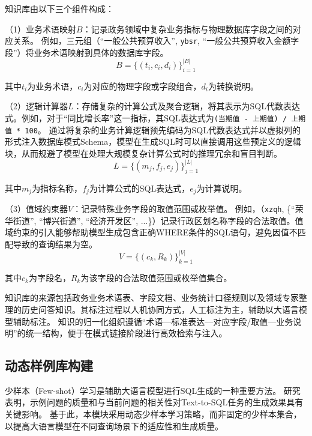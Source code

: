 知识库由以下三个组件构成：

（1）业务术语映射$B$：记录政务领域中复杂业务指标与物理数据库字段之间的对应关系。
例如，三元组（“一般公共预算收入”, \texttt{ybsr}, “一般公共预算收入金额字段”）将业务术语映射到具体的数据库字段。
\begin{equation}
	B = \{(t_i, c_i, d_i)\}_{i=1}^{|B|}
\end{equation}
\par
其中$t_i$为业务术语，$c_i$为对应的物理字段或字段组合，$d_i$为转换说明。

（2）逻辑计算器$L$：存储复杂的计算公式及聚合逻辑，将其表示为SQL代数表达式。例如，对于“同比增长率”这一指标，其SQL表达式为\texttt{(当期值 - 上期值) / 上期值 * 100}。
通过将复杂的业务计算逻辑预先编码为SQL代数表达式并以虚拟列的形式注入数据库模式Schema，模型在生成SQL时可以直接调用这些预定义的逻辑块，从而规避了模型在处理大规模复杂计算公式时的推理冗余和盲目判断。
\begin{equation}
	L = \{(m_j, f_j, e_j)\}_{j=1}^{|L|}
\end{equation}
\par
其中$m_j$为指标名称，$f_j$为计算公式的SQL表达式，$e_j$为计算说明。

（3）值域约束器$V$：记录特殊业务字段的取值范围或枚举值。
例如，（\texttt{xzqh}, \{“荣华街道”, “博兴街道”, “经济开发区”, ...\}）记录行政区划名称字段的合法取值。值域约束的引入能够帮助模型生成包含正确WHERE条件的SQL语句，避免因值不匹配导致的查询结果为空。
\begin{equation}
	V = \{(c_k, R_k)\}_{k=1}^{|V|}
\end{equation}
\par
其中$c_k$为字段名，$R_k$为该字段的合法取值范围或枚举值集合。

知识库的来源包括政务业务术语表、字段文档、业务统计口径规则以及领域专家整理的历史问答知识。其标注过程以人机协同方式，人工标注为主，辅助以大语言模型辅助标注。
知识的归一化组织遵循“术语—标准表达—对应字段/取值—业务说明”的统一结构，便于在模式链接阶段进行高效检索与注入。


\subsection{动态样例库构建}\label{subsec:dynamic_example_retrieval}

少样本（Few-shot）学习是辅助大语言模型进行SQL生成的一种重要方法。
研究表明，示例问题的质量和与当前问题的相关性对Text-to-SQL任务的生成效果具有关键影响\cite{gao2024text2sql,xie2025opensearch}。
基于此，本模块采用动态少样本学习策略，而非固定的少样本集合，以提高大语言模型在不同查询场景下的适应性和生成质量。

